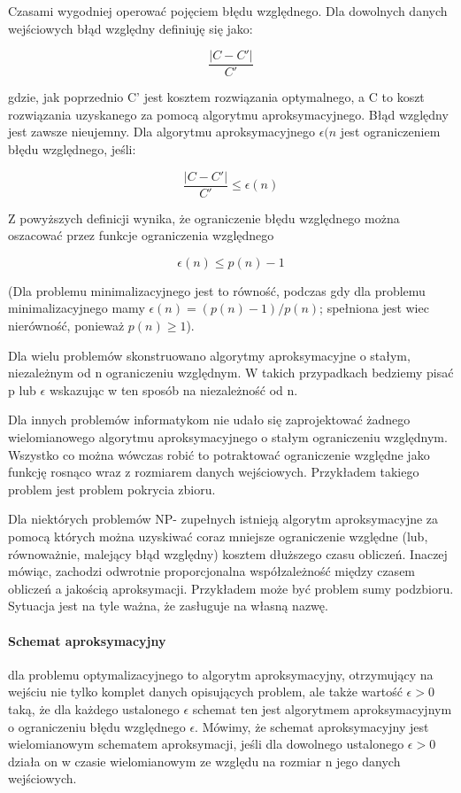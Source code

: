 \documentclass[]{report}
\begin{document}
Czasami wygodniej operować pojęciem błędu względnego. Dla dowolnych danych wejściowych błąd względny definiuję się jako:

$$ \frac{|C-C'|}{C'}$$

gdzie, jak poprzednio C' jest kosztem rozwiązania optymalnego, a C to koszt rozwiązania uzyskanego za pomocą algorytmu aproksymacyjnego. Błąd względny jest zawsze nieujemny. Dla algorytmu aproksymacyjnego $\epsilon (n$ jest ograniczeniem błędu względnego, jeśli:

$$ \frac{|C-C'|}{C'} \le \epsilon(n)$$


Z powyższych definicji wynika, że ograniczenie błędu względnego można oszacować przez funkcje ograniczenia względnego

$$ \epsilon (n) \le p(n) -1 $$

(Dla problemu minimalizacyjnego jest to równość, podczas gdy dla problemu minimalizacyjnego mamy $\epsilon (n) = (p(n)-1)/p(n) $; spełniona jest wiec nierówność, ponieważ $ p(n) \ge 1 $).

Dla wielu problemów skonstruowano algorytmy aproksymacyjne o stałym, niezależnym od n ograniczeniu względnym. W takich przypadkach bedziemy pisać p lub $\epsilon$ wskazując w ten sposób na niezależność od n.

Dla innych problemów informatykom nie udało się zaprojektować żadnego wielomianowego algorytmu aproksymacyjnego o stałym ograniczeniu względnym. Wszystko co można wówczas robić to potraktować ograniczenie względne jako funkcję rosnąco wraz z rozmiarem danych wejściowych. Przykładem takiego problem jest problem pokrycia zbioru.

Dla niektórych problemów NP- zupełnych istnieją algorytm aproksymacyjne za pomocą których można uzyskiwać coraz mniejsze ograniczenie względne (lub, równoważnie, malejący błąd względny) kosztem dłuższego czasu obliczeń. Inaczej mówiąc, zachodzi odwrotnie proporcjonalna współzależność między czasem obliczeń a jakością aproksymacji. Przykładem może być problem sumy podzbioru. Sytuacja jest na tyle ważna, że zasługuje na własną nazwę.

\paragraph{Schemat aproksymacyjny} dla problemu optymalizacyjnego to algorytm aproksymacyjny, otrzymujący na wejściu nie tylko komplet danych opisujących problem, ale także wartość $\epsilon > 0$ taką, że dla każdego ustalonego $\epsilon$ schemat ten jest algorytmem aproksymacyjnym o ograniczeniu błędu względnego $\epsilon$. Mówimy, że schemat aproksymacyjny jest wielomianowym schematem aproksymacji, jeśli dla dowolnego ustalonego $\epsilon > 0$ działa on w czasie wielomianowym ze względu na rozmiar n jego danych wejściowych.
\end{document}
